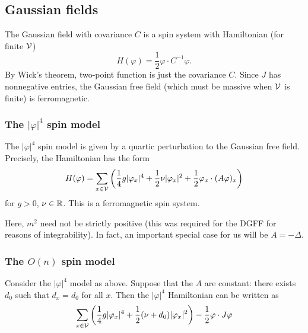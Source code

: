 
\subsection{Gaussian fields}

The Gaussian field with covariance $C$ is a spin system with Hamiltonian (for finite
$\mathcal{V}$)
\begin{equation}
H(\varphi) = \frac{1}{2} \varphi \cdot C^{-1} \varphi.
\end{equation}
By Wick's theorem, two-point function is just the covariance $C$.
Since $J$ has nonnegative entries, the Gaussian free field (which must be massive when
$\mathcal{V}$ is finite) is ferromagnetic.


\subsubsection{The $|\varphi|^4$ spin model}

The $|\varphi|^4$ spin model is given by a quartic perturbation to the Gaussian free field.
Precisely, the Hamiltonian has the form
\begin{equation}
H(\varphi)
  =
\sum_{x\in\mathcal{V}}
\left(
  \frac{1}{4} g |\varphi_x|^4
    +
  \frac{1}{2} \nu |\varphi_x|^2
    +
  \frac{1}{2} \varphi_x \cdot (A \varphi)_x
\right)
\end{equation}
for $g > 0$, $\nu\in{\mathbb R}$. This is a ferromagnetic spin system.

Here, $m^2$ need not be strictly positive (this was required for the DGFF for reasons of
integrability). In fact, an important special case for us will be $A = -\Delta$.


\subsubsection{The $O(n)$ spin model}

Consider the $|\varphi|^4$ model as above. Suppose that the $A$ are constant:
there exists $d_0$ such that $d_x = d_0$ for all $x$.
Then the $|\varphi|^4$ Hamiltonian can be written as
\begin{equation}
\sum_{x\in\mathcal{V}}
\left(
  \frac{1}{4} g |\varphi_x|^4
    +
  \frac{1}{2} (\nu + d_0) |\varphi_x|^2
\right)
  -
\frac{1}{2} \varphi \cdot J \varphi
\end{equation}

